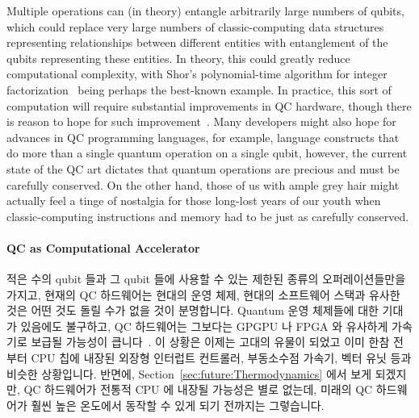 Multiple  operations can (in theory) entangle arbitrarily
large numbers of qubits, which could replace very large numbers of
classic-computing data structures representing relationships between
different entities with entanglement of the qubits
representing these entities.
In theory, this could greatly reduce computational complexity, with
Shor's polynomial-time algorithm for integer
factorization~\cite{Shor:1997:PAP:264393.264406}
being perhaps the best-known example.
In practice, this sort of computation will require substantial
improvements in QC hardware, though there is reason to hope
for such improvement~\cite{RobertMcConnell2015QC-Entangle3000Atoms}.
Many developers might also hope for advances in QC programming languages,
for example, language constructs that do more than a single quantum
operation on a single qubit, however, the current state of the
QC art dictates that quantum operations are precious and must
be carefully conserved.
On the other hand, those of us with ample grey hair might actually
feel a tinge of nostalgia for those long-lost years of our youth when
classic-computing instructions and memory had to be just as carefully
conserved.
\fi

\paragraph{QC as Computational Accelerator}

적은 수의 qubit 들과 그 qubit 들에 사용할 수 있는 제한된 종류의
오퍼레이션들만을 가지고, 현재의 QC 하드웨어는 현대의 운영 체제, 현대의
소프트웨어 스택과 유사한 것은 어떤 것도 돌릴 수가 없을 것이 분명합니다.
Quantum 운영 체제들에 대한 기대가 있음에도 불구하고, QC 하드웨어는 그보다는
GPGPU 나 FPGA 와 유사하게 가속기로 보급될 가능성이
큽니다~\cite{HenryCorriganGibbs2017QCOS}.
이 상황은 이제는 고대의 유물이 되었고 이미 한참 전부터 CPU 칩에 내장된 외장형
인터럽트 컨트롤러, 부동소수점 가속기, 벡터 유닛 등과 비슷한 상황입니다.
반면에, Section~\ref{sec:future:Thermodynamics} 에서 보게 되겠지만, QC
하드웨어가 전통적 CPU 에 내장될 가능성은 별로 없는데, 미래의 QC 하드웨어가 훨씬
높은 온도에서 동작할 수 있게 되기 전까지는 그렇습니다.

